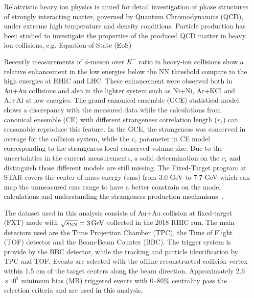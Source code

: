 \documentclass[%
 reprint,	
showpacs,
 amsmath,amssymb,
 aps,
 prc,
]{revtex4-1}
\begin{document}
\maketitle


Relativistic heavy ion physics is aimed for detail investigation of phase structures of strongly interacting matter, governed by Quantum Chromodynamics (QCD), under extreme high temperature and density conditions. Particle production has been studied to investigate the properties of the produced QCD matter in heavy ion collisions, e.g. Equation-of-State (EoS) 


Recently measurements of $\phi$-meson over $K^-$ ratio in heavy-ion collisions show a relative enhancement in the low energies below the NN threshold compare to the high energies at RHIC and LHC. These enhancement were observed both in Au+Au collisions and also in the lighter system such as Ni+Ni, Ar+KCl and Al+Al at low energies. The grand canonical ensemble (GCE) statistical model shows a discrepancy with the measured data while the calculations from canonical ensemble (CE) with different strangeness correlation length ($r_c$) can reasonable reproduce this feature. In the GCE, the strangeness was conserved in average for the collision system, while the $r_c$ parameter in CE model corresponding to the strangeness local conserved volume size. Due to the uncertainties in the current measurements, a solid determination on the $r_c$ and distinguish those different models are still missing. The Fixed-Target program at STAR covers the center-of-mass energy (cms) from 3.0 GeV to 7.7 GeV which can map the unmeasured cms range to have a better constrain on the model calculations and understanding the strangeness production mechanisms~\cite{}.


The dataset used in this analysis consists of Au+Au collision at fixed-target (FXT) mode with ${\sqrt{s_{\rm NN}} = \rm{3\,GeV}}$ collected in the 2018 RHIC run. The main detectors used are the Time Projection Chamber (TPC), the Time of Flight (TOF) detector and the Beam-Beam Counter (BBC). The trigger system is provide by the BBC detector, while the tracking and particle identification by TPC and TOF. Events are selected with the offline reconstructed collision vertex within 1.5 cm of the target centers along the beam direction. Approximately 2.6$\times 10^{8}$ minimum bias (MB) triggered events with 0--80\% centrality pass the selection criteria and are used in this analysis. 
\end{document}
